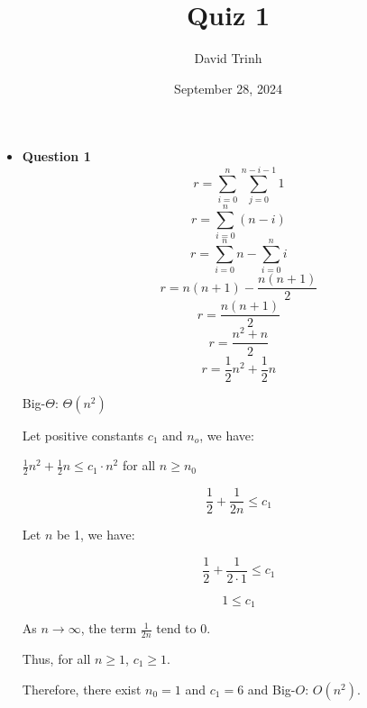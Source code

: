 \documentclass{article}
\title{Quiz 1}
\author{David Trinh}
\date{September 28, 2024}
\begin{document}
\maketitle

\begin{itemize}

    \item\textbf{ Question 1}
        \begin{equation}
            r=\sum^{n}_{i=0} \sum^{n-i-1}_{j=0} 1
        \end{equation}
        \begin{equation}
            r=\sum^{n}_{i=0} (n - i)
        \end{equation}
        \begin{equation}
            r=\sum^{n}_{i=0} n - \sum^{n}_{i=0} i
        \end{equation}
        \begin{equation}
            r=n(n + 1) - \frac{n(n + 1)}{2}
        \end{equation}
        \begin{equation}
            r=\frac{n(n + 1)}{2}
        \end{equation}
        \begin{equation}
            r=\frac{n^2 + n}{2}
        \end{equation}
        \begin{equation}
            r=\frac{1}{2} n^2 + \frac{1}{2} n
        \end{equation}

        Big-$\Theta$: $\Theta(n^2)$

        Let positive constants $c_1$ and $n_o$, we have:

        \begin{center}
            $\frac{1}{2} n^2 + \frac{1}{2} n \le c_1\cdot n^2$ for all $n \ge n_0$
        \end{center}

        $$\frac{1}{2} + \frac{1}{2n} \le c_1$$

        Let $n$ be 1, we have:

        $$\frac{1}{2} + \frac{1}{2 \cdot 1} \le c_1$$

        $$1 \le c_1$$

        As $n \to \infty$, the term $\frac{1}{2n}$ tend to $0$.

        Thus, for all $n \ge 1$, $c_1 \ge 1$.

        Therefore, there exist $n_0 = 1$ and $c_1 = 6$ and Big-$O$: $O(n^2)$.\\


\end{itemize}
\end{document}
